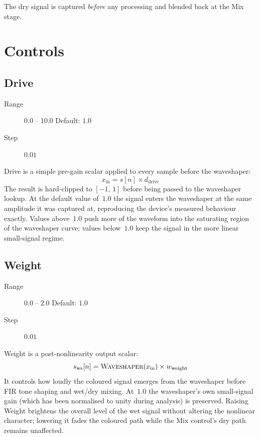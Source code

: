 \documentclass[11pt, letterpaper]{article}
\begin{document}
\noindent
The dry signal is captured \emph{before} any processing and blended
back at the Mix stage.

\section{Controls}

\subsection{Drive}

\begin{description}
  \item[Range] \(0.0 \;\text{--}\; 10.0\) \quad Default: \(1.0\)
  \item[Step]  \(0.01\)
\end{description}

Drive is a simple pre-gain scalar applied to every sample before the
waveshaper:
\[
  x_{\text{in}} = s[n] \times d_{\text{drive}}
\]
The result is hard-clipped to \([-1,\,1]\) before being passed to the
waveshaper lookup.  At the default value of~\(1.0\) the signal enters
the waveshaper at the same amplitude it was captured at, reproducing
the device's measured behaviour exactly.  Values above~\(1.0\) push
more of the waveform into the saturating region of the waveshaper
curve; values below~\(1.0\) keep the signal in the more linear
small-signal regime.

\subsection{Weight}

\begin{description}
  \item[Range] \(0.0 \;\text{--}\; 2.0\) \quad Default: \(1.0\)
  \item[Step]  \(0.01\)
\end{description}

Weight is a post-nonlinearity output scalar:
\[
  s_{\text{ws}}[n] = \textsc{Waveshaper}(x_{\text{in}}) \times w_{\text{weight}}
\]
It controls how loudly the coloured signal emerges from the waveshaper
before FIR tone shaping and wet/dry mixing.  At~\(1.0\) the
waveshaper's own small-signal gain (which has been normalised to unity
during analysis) is preserved.  Raising Weight brightens the overall
level of the wet signal without altering the nonlinear character;
lowering it fades the coloured path while the Mix control's dry path
remains unaffected.
\end{document}
